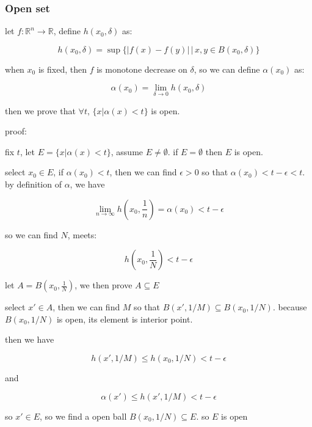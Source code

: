 \documentclass[12pt,a4paper]{ctexart}
\begin{document}
\subsubsection{Open set}

let $f: \mathbb{R}^n \to \mathbb{R}$, define $h(x_0,\delta)$ as:

\[
h(x_0, \delta) = \sup \{ \lvert f(x) - f(y) \rvert \,\vert\, x,y \in B(x_0, \delta)\}
\]

when $x_0$ is fixed, then $f$ is monotone decrease on $\delta$, so we can define $\alpha(x_0)$ as:

\[
\alpha(x_0) = \lim_{\delta \to 0} h(x_0, \delta)
\]

then we prove that $\forall t,\, \{ x \vert \alpha(x) < t\}$ is open.

proof:

fix $t$, let $E = \{ x \vert \alpha(x) < t\}$, assume $E \ne \emptyset$. if $E = \emptyset$ then $E$ is open.

select $x_0 \in E$, if $\alpha(x_0) < t$, then we can find $\epsilon > 0$ so that $\alpha(x_0) < t - \epsilon < t$.
by definition of $\alpha$, we have

\[
\lim_{n \to \infty}h(x_0, \frac{1}{n}) = \alpha(x_0) < t - \epsilon
\]

so we can find $N$, meets:

\[
h(x_0, \frac{1}{N}) < t-\epsilon
\]

let $A = B(x_0, \frac{1}{N})$, we then prove $A \subseteq E$

select $x' \in A$, then we can find $M$ so that $B(x', 1/M) \subseteq B(x_0, 1/N)$. because $B(x_0, 1/N)$ is open, its element is interior point.

then we have

\[
h(x', 1/M) \le h(x_0, 1/N) < t - \epsilon
\]

and 

\[
\alpha(x') \le h(x', 1/M) < t-\epsilon
\]

so $x' \in E$, so we find a open ball $B(x_0, 1/N) \subseteq E$. so $E$ is open
\end{document}
